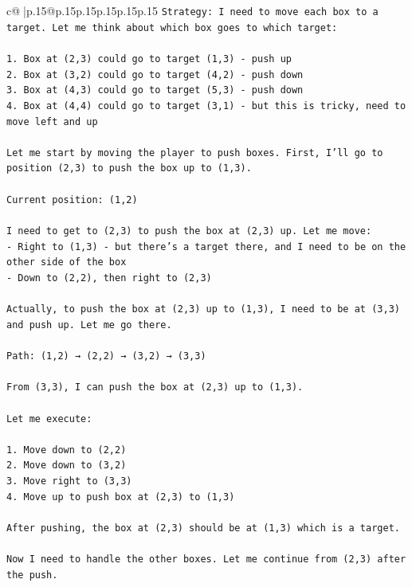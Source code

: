 \documentclass{article}
\begin{document}
{\begin{supertabular}{c@{$\;$}|p{.15\linewidth}@{}p{.15\linewidth}p{.15\linewidth}p{.15\linewidth}p{.15\linewidth}p{.15\linewidth}}
{{{\texttt{Strategy: I need to move each box to a target. Let me think about which box goes to which target:} \\
\\ 
\texttt{1. Box at (2,3) could go to target (1,3) {-} push up} \\
\texttt{2. Box at (3,2) could go to target (4,2) {-} push down} \\
\texttt{3. Box at (4,3) could go to target (5,3) {-} push down} \\
\texttt{4. Box at (4,4) could go to target (3,1) {-} but this is tricky, need to move left and up} \\
\\ 
\texttt{Let me start by moving the player to push boxes. First, I'll go to position (2,3) to push the box up to (1,3).} \\
\\ 
\texttt{Current position: (1,2)} \\
\\ 
\texttt{I need to get to (2,3) to push the box at (2,3) up. Let me move:} \\
\texttt{{-} Right to (1,3) {-} but there's a target there, and I need to be on the other side of the box} \\
\texttt{{-} Down to (2,2), then right to (2,3)} \\
\\ 
\texttt{Actually, to push the box at (2,3) up to (1,3), I need to be at (3,3) and push up. Let me go there.} \\
\\ 
\texttt{Path: (1,2) → (2,2) → (3,2) → (3,3)} \\
\\ 
\texttt{From (3,3), I can push the box at (2,3) up to (1,3).} \\
\\ 
\texttt{Let me execute:} \\
\\ 
\texttt{1. Move down to (2,2)} \\
\texttt{2. Move down to (3,2)} \\
\texttt{3. Move right to (3,3)} \\
\texttt{4. Move up to push box at (2,3) to (1,3)} \\
\\ 
\texttt{After pushing, the box at (2,3) should be at (1,3) which is a target.} \\
\\ 
\texttt{Now I need to handle the other boxes. Let me continue from (2,3) after the push.} \\
}}}
\end{supertabular}}
\end{document}
